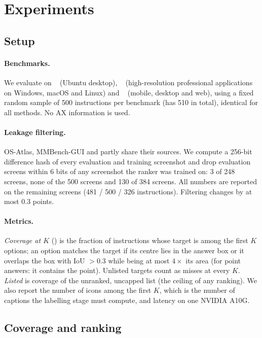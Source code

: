 \section{Experiments}
\label{sec:experiments}

\subsection{Setup}
\label{sec:setup}

\paragraph{Benchmarks.}
We evaluate on \osw~\cite{xie2025jedi} (Ubuntu desktop), \sspro~\cite{li2025screenspotpro} (high-resolution
professional applications on Windows, macOS and Linux) and \ssv~\cite{cheng2024seeclick} (mobile, desktop and
web), using a fixed random sample of 500 instructions per benchmark (\osw has 510 in total), identical for all
methods. No AX information is used.

\paragraph{Leakage filtering.}
OS-Atlas, MMBench-GUI and \ssv partly share their sources. We compute a 256-bit difference hash of every
evaluation and training screenshot and drop evaluation screens within 6 bits of any screenshot the ranker was
trained on: 3 of 248 \osw screens, none of the 500 \sspro screens and 130 of 384 \ssv screens. All numbers are
reported on the remaining screens (481 / 500 / 326 instructions). Filtering changes  by at most 0.3 points.

\paragraph{Metrics.}
\emph{Coverage at $K$} () is the fraction of instructions whose target is among the first $K$ options; an
option matches the target if its centre lies in the answer box or it overlaps the box with IoU $>0.3$ while being
at most $4\times$ its area (for point answers: it contains the point). Unlisted targets count as misses at every
$K$. \emph{Listed} is coverage of the unranked, uncapped list (the ceiling of any ranking). We also report the
number of icons among the first $K$, which is the number of captions the labelling stage must compute, and
latency on one NVIDIA A10G.

\subsection{Coverage and ranking}

